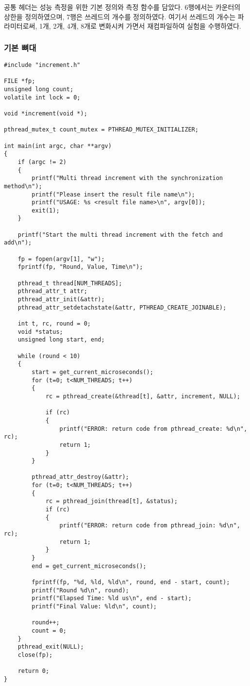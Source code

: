 \documentclass[11pt, a4paper]{article}
\begin{document}
공통 헤더는 성능 측정을 위한 기본 정의와 측정 함수를 담았다. 6행에서는 카운터의 상한을 정의하였으며, 7행은 쓰레드의 개수를 정의하였다. 여기서 쓰레드의 개수는 파라미터로써, 1개, 2개, 4개, 8개로 변화시켜 가면서 재컴파일하여 실험을 수행하였다.

\subsubsection{기본 뼈대}

\begin{lstlisting}
#include "increment.h"

FILE *fp;
unsigned long count;
volatile int lock = 0;

void *increment(void *);

pthread_mutex_t count_mutex = PTHREAD_MUTEX_INITIALIZER;

int main(int argc, char **argv)
{
	if (argc != 2)
	{
		printf("Multi thread increment with the synchronization method\n");
		printf("Please insert the result file name\n");
		printf("USAGE: %s <result file name>\n", argv[0]);
		exit(1);
	}

	printf("Start the multi thread increment with the fetch and add\n");

	fp = fopen(argv[1], "w");
	fprintf(fp, "Round, Value, Time\n");

	pthread_t thread[NUM_THREADS];
	pthread_attr_t attr;
	pthread_attr_init(&attr);
	pthread_attr_setdetachstate(&attr, PTHREAD_CREATE_JOINABLE);

	int t, rc, round = 0;
	void *status;
	unsigned long start, end;

	while (round < 10)
	{
		start = get_current_microseconds();
		for (t=0; t<NUM_THREADS; t++)
		{
			rc = pthread_create(&thread[t], &attr, increment, NULL);
	
			if (rc)
			{
				printf("ERROR: return code from pthread_create: %d\n", rc);
				return 1;
			}
		}

		pthread_attr_destroy(&attr);
		for (t=0; t<NUM_THREADS; t++)
		{
			rc = pthread_join(thread[t], &status);
			if (rc)
			{
				printf("ERROR: return code from pthread_join: %d\n", rc);
				return 1;
			}
		}
		end = get_current_microseconds();

		fprintf(fp, "%d, %ld, %ld\n", round, end - start, count);
		printf("Round %d\n", round);
		printf("Elapsed Time: %ld us\n", end - start);
		printf("Final Value: %ld\n", count);

		round++;
		count = 0;
	}
	pthread_exit(NULL);
	close(fp);

	return 0;
}
\end{lstlisting}
\end{document}
